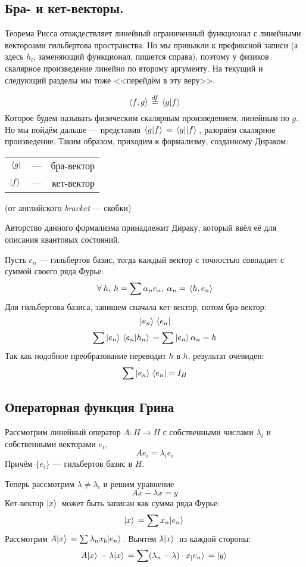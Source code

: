 	\subsection*{Бра- и кет-векторы.}
	Теорема Рисса отождествляет линейный ограниченный функционал с линейными вектороами гильбертова пространства.
	Но мы привыкли к префиксной записи (а здесь $h_l$, заменяющий функционал, пишется справа), поэтому у физиков
	скалярное произведение линейно по второму аргументу. На текущий и следующий разделы мы тоже <<перейдём в эту веру>>.
	
	$$\, \langle f, g \rangle \, \overset{df}{=} \, \langle g | f \rangle \,$$
	Которое будем называть физическим скалярным произведением, линейным по $g$. Но мы пойдём дальше --- представив
	$\, \langle g | f \rangle \, = \, \langle g | | f \rangle \,$, разорвём скалярное произведение. Таким образом, приходим к формализму, 
	созданному Дираком: \\
	\begin{tabular}{l c r}
		$\, \langle g |$ & --- & бра-вектор \\
		$| f \rangle \,$ & --- & кет-вектор \\
	\end{tabular}
	(от английского \textit{bracket} --- скобки)
	
	Авторство данного формализма принадлежит Дираку, который ввёл её для описания квантовых состояний.
	
	Пусть $e_n$ --- гильбертов базис, тогда каждый вектор с точностью совпадает с суммой своего ряда Фурье:
	$$ \forall h,\: h = \sum \alpha_n e_n,\: \alpha_n = \scal{h}{e_n} $$
	Для гильбертова базиса, запишем сначала кет-вектор, потом бра-вектор:
	$$ | e_n \rangle \, \, \langle e_n | $$
	$$ \sum | e_n \rangle \, \, \langle e_n | h_n \rangle \, = \sum | e_n \rangle \, \alpha_n = h $$
	Так как подобное преобразование переводит $h$ в $h$, результат очевиден:
	$$ \sum | e_n \rangle \, \, \langle e_n | = I_H $$
	
	\subsection*{Операторная функция Грина}
	
	Рассмотрим линейный оператор $A : H \rightarrow H$ с собственными числами $\lambda_i$ и собственными векторами $e_i$,
	$$A e_i = \lambda_i e_i$$
	Причём $\{e_i\}$ --- гильбертов базис в $H$.
	
	Теперь рассмотрим $\lambda \neq \lambda_i$ и решим уравнение
	$$ Ax - \lambda x = y $$
	Кет-вектор $| x \rangle \,$ может быть записан как сумма ряда Фурье:
	$$ | x \rangle \, = \sum x_n | e_n \rangle \, $$
	Рассмотрим $A | x \rangle \, = \sum \lambda_n x_b | e_n \rangle \,$. Вычтем $\lambda | x \rangle \,$ из каждой стороны:
	\begin{equation} \label{ketEq}
		A| x \rangle \, - \lambda| x \rangle \, = \sum (\lambda_n - \lambda) \cdot x_ | e_n \rangle \, = | y \rangle \,
	\end{equation}
	
